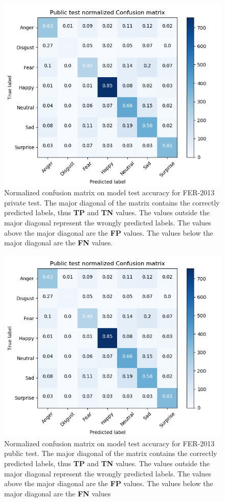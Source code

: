 \documentclass[master]{thesis-uestc}
\begin{document}
\begin{figure}[ht]
\includegraphics[width=5in]{pic/FER-2013_public_test_CM_normalzed.png}
\caption{Normalized confusion matrix on model test accuracy for FER-2013 private test. The major diagonal of the matrix contains the correctly predicted labels, thus \textbf{TP} and \textbf{TN} values. The values outside the major diagonal represent the wrongly predicted labels. The values above the major diagonal are the \textbf{FP} values. The values below the major diagonal are the \textbf{FN} values.}
\label{fig_ferpr_cm_scores}
\end{figure}

\begin{figure}[ht]
\includegraphics[width=5in]{pic/FER-2013_public_test_CM_normalzed.png}
\caption{Normalized confusion matrix on model test accuracy for FER-2013 public test. The major diagonal of the matrix contains the correctly predicted labels, thus \textbf{TP} and \textbf{TN} values. The values outside the major diagonal represent the wrongly predicted labels. The values above the major diagonal are the \textbf{FP} values. The values below the major diagonal are the \textbf{FN} values}
\label{fig_ferpub_cm_scores}
\end{figure}
\end{document}
